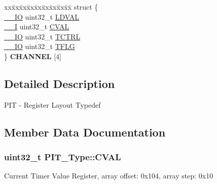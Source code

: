 \begin{DoxyCompactItemize}
\begin{tabbing}
\end{tabbing}\item 
\begin{tabbing}
xx\=xx\=xx\=xx\=xx\=xx\=xx\=xx\=xx\=\kill
struct \{\\
\>\hyperlink{core__sc300_8h_aec43007d9998a0a0e01faede4133d6be}{\_\_IO} uint32\_t \hyperlink{structPIT__Type_a6880c80d3b65e0e5831b72371f607224}{LDVAL}\\
\>\hyperlink{core__sc300_8h_af63697ed9952cc71e1225efe205f6cd3}{\_\_I} uint32\_t \hyperlink{structPIT__Type_af98efdc8f0866cbaa72e83cfa391cac9}{CVAL}\\
\>\hyperlink{core__sc300_8h_aec43007d9998a0a0e01faede4133d6be}{\_\_IO} uint32\_t \hyperlink{structPIT__Type_a1efb9476e302dfe00faf684173c5b6ea}{TCTRL}\\
\>\hyperlink{core__sc300_8h_aec43007d9998a0a0e01faede4133d6be}{\_\_IO} uint32\_t \hyperlink{structPIT__Type_af54765dd193a93cd7bddf1eb6b0c30fa}{TFLG}\\
\} {\bfseries CHANNEL} \mbox{[}4\mbox{]}\hypertarget{structPIT__Type_a087c67384273cb2b88ed02760bfc69bc}{}\label{structPIT__Type_a087c67384273cb2b88ed02760bfc69bc}
\\

\end{tabbing}\end{DoxyCompactItemize}


\subsection{Detailed Description}
P\+IT -\/ Register Layout Typedef 

\subsection{Member Data Documentation}
\subsubsection[{\texorpdfstring{C\+V\+AL}{CVAL}}]{ uint32\+\_\+t P\+I\+T\+\_\+\+Type\+::\+C\+V\+AL}\hypertarget{structPIT__Type_af98efdc8f0866cbaa72e83cfa391cac9}{}\label{structPIT__Type_af98efdc8f0866cbaa72e83cfa391cac9}
Current Timer Value Register, array offset\+: 0x104, array step\+: 0x10 
